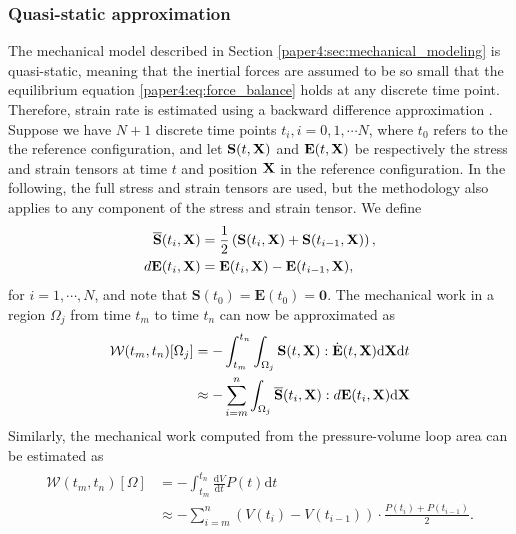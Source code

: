\subsubsection{Quasi-static approximation}
The mechanical model described in Section
\ref{paper4:sec:mechanical_modeling} is quasi-static, meaning that the
inertial forces are assumed to be so small that the
equilibrium equation \eqref{paper4:eq:force_balance} holds at any discrete
time point. Therefore, strain rate is estimated using a
backward difference approximation \cite{wang2011myocardial}.
Suppose we have $N+1$ discrete time points $t_i, i = 0,1, \cdots N$, where $ t_0$
refers to the the reference configuration, and let $\mathbf{S}(t, \mathbf{X})$
and $\mathbf{E}(t, \mathbf{X})$ be respectively the stress and strain tensors at
time $t$ and position $\mathbf{X}$ in the reference configuration. In the
following, the full stress and strain tensors are used, but the methodology
also applies to any component of the stress and strain tensor. We define
\begin{align}
  \overline{\mathbf{S}}(t_i,\mathbf{X}) &= \frac{1}{2}\left( \mathbf{S}(t_i,\mathbf{X}) + \mathbf{S}(t_{i-1},\mathbf{X}) \right),\\
  d\mathbf{E}(t_i,\mathbf{X}) &= \mathbf{E}(t_i,\mathbf{X}) - \mathbf{E}(t_{i-1},\mathbf{X}),
\end{align}
for $i = 1,\cdots, N$, and note that $ \mathbf{S}(t_0) = \mathbf{E}(t_0) = \mathbf{0}$.
The mechanical work in a region $\Omega_j$ from time $t_m$ to time $t_n$ can now be approximated
as 
\begin{align}
  \begin{split}
   \mathcal{W}(t_m, t_n)[\Omega_j]
  &= -\int_{t_m}^{t_n} \int_{\Omega_j}\mathbf{S}(t, \mathbf{X}) : \dot{\mathbf{E}}(t, \mathbf{X}) \mathrm{d}\mathbf{X} \mathrm{d}t \\
  &\approx - \sum_{i = m}^{n}\int_{\Omega_j}\overline{\mathbf{S}}(t_i, \mathbf{X}) : d\mathbf{E}(t_i, \mathbf{X}) \mathrm{d}\mathbf{X}
  \end{split}
\label{paper4:eq:total_work}
\end{align}
Similarly, the mechanical work computed from the pressure-volume loop area can be estimated as  
\begin{align}
  \begin{split}
  \mathcal{W}(t_m,t_n)[\Omega]
  &= - \int_{t_m}^{t_n} \frac{\mathrm{d}V}{\mathrm{d}t} P(t) \mathrm{d}t \\
  &\approx -\sum_{i= m}^{n}  (V(t_i) - V(t_{i-1})) \cdot \frac{P(t_i) + P(t_{i-1})}{2}.
  \end{split}
\end{align}

